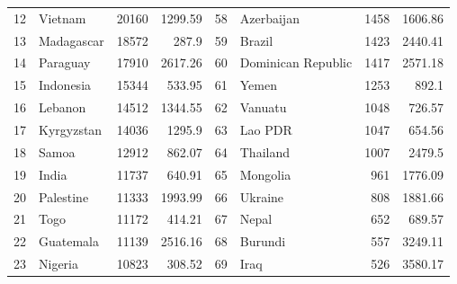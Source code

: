\begin{longtable}{|c|l|r|r|c|l|r|r|}
	12          & Vietnam               & 20160                  & 1299.59                         & 58          & Azerbaijan            & 1458                   & 1606.86                         \\
	13          & Madagascar            & 18572                  & 287.9                           & 59          & Brazil                & 1423                   & 2440.41                         \\
	14          & Paraguay              & 17910                  & 2617.26                         & 60          & Dominican Republic    & 1417                   & 2571.18                         \\
	15          & Indonesia             & 15344                  & 533.95                          & 61          & Yemen                 & 1253                   & 892.1                           \\
	16          & Lebanon               & 14512                  & 1344.55                         & 62          & Vanuatu               & 1048                   & 726.57                          \\
	17          & Kyrgyzstan            & 14036                  & 1295.9                          & 63          & Lao PDR               & 1047                   & 654.56                          \\
	18          & Samoa                 & 12912                  & 862.07                          & 64          & Thailand              & 1007                   & 2479.5                          \\
	19          & India                 & 11737                  & 640.91                          & 65          & Mongolia              & 961                    & 1776.09                         \\
	20          & Palestine             & 11333                  & 1993.99                         & 66          & Ukraine               & 808                    & 1881.66                         \\
	21          & Togo                  & 11172                  & 414.21                          & 67          & Nepal                 & 652                    & 689.57                          \\
	22          & Guatemala             & 11139                  & 2516.16                         & 68          & Burundi               & 557                    & 3249.11                         \\
	23          & Nigeria               & 10823                  & 308.52                          & 69          & Iraq                  & 526                    & 3580.17                         \\

\end{longtable}
